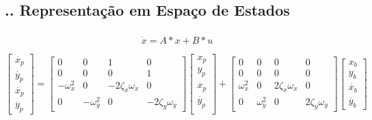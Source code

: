 \documentclass[aspectratio=169]{beamer}
\begin{document}
\subsection{\insertsectionnumber .\insertsubsectionnumber . Representação em Espaço de Estados}
\begin{frame}
  \frametitle{\insertsubsection}
  \begin{equation}
    \label{eq:simp_state_space_din_model}
    \dot x = A*x+B*u
  \end{equation}
  
  \begin{equation}
    \label{eq:espaco_de_estados_din_model}
    \begin{bmatrix}
        \dot{x_p} \\
        \dot{y_p} \\
        \ddot{x_p} \\
        \ddot{y_p}
    \end{bmatrix}
    =
    \begin{bmatrix}
        0 & 0 & 1 & 0 \\
        0 & 0 & 0 & 1 \\
        -\omega _x ^2 & 0 & -2 \zeta _x \omega _x & 0 \\
        0 & -\omega _y ^2 & 0 & -2 \zeta _y \omega _y
    \end{bmatrix}
    \begin{bmatrix}
        x_p \\    
        y_p \\
        \dot{x_p} \\    
        \dot{y_p} \\
    \end{bmatrix}
    +
    \begin{bmatrix}
        0 & 0 & 0 & 0 \\
        0 & 0 & 0 & 0 \\
        \omega _x ^2 & 0 & 2 \zeta _x \omega _x & 0 \\
        0 & \omega _y ^2 & 0 & 2 \zeta _y \omega _y
    \end{bmatrix}
    \begin{bmatrix}
        x_b \\
        y_b \\
        \dot{x_b}  \\
        \dot{y_b} 
    \end{bmatrix}
  \end{equation}
\end{frame}
\end{document}
